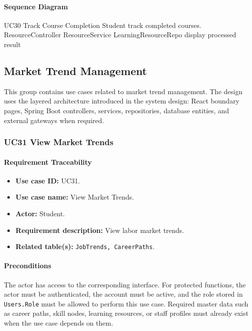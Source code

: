 \paragraph{Sequence Diagram}

\SequenceDiagram
{UC30 Track Course Completion}
{Student}
{track completed courses.}
{ResourceController}
{ResourceService}
{LearningResourceRepo}
{display processed result}

\subsection{Market Trend Management}

This group contains use cases related to market trend management. The design uses the layered architecture introduced in the system design: React boundary pages, Spring Boot controllers, services, repositories, database entities, and external gateways when required.

\subsubsection{UC31 View Market Trends}

\paragraph{Requirement Traceability}

\begin{itemize}
    \item \textbf{Use case ID:} UC31.
    \item \textbf{Use case name:} View Market Trends.
    \item \textbf{Actor:} Student.
    \item \textbf{Requirement description:} View labor market trends.
    \item \textbf{Related table(s):} \texttt{JobTrends, CareerPaths}.
\end{itemize}

\paragraph{Preconditions}

The actor has access to the corresponding interface. For protected functions, the actor must be authenticated, the account must be active, and the role stored in \texttt{Users.Role} must be allowed to perform this use case. Required master data such as career paths, skill nodes, learning resources, or staff profiles must already exist when the use case depends on them.

